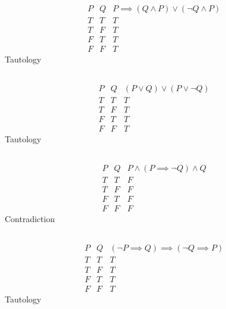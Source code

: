 \documentclass{article}
\begin{document}
\begin{equation}
    \begin{array}{c|c|c}
        P & Q & P \implies (Q \land P) \lor (\lnot Q \land P) \\
        \hline
        T & T & T \\
        T & F & T \\
        F & T & T \\
        F & F & T
    \end{array}
\end{equation}
Tautology

\subsection{}

\begin{equation}
    \begin{array}{c|c|c}
        P & Q & (P \lor Q) \lor (P \lor \lnot Q) \\
        \hline
        T & T & T \\
        T & F & T \\
        F & T & T \\
        F & F & T
    \end{array}
\end{equation}
Tautology

\subsection{}

\begin{equation}
    \begin{array}{c|c|c}
        P & Q & P \land (P \implies \lnot Q) \land Q \\
        \hline
        T & T & F \\
        T & F & F \\
        F & T & F \\
        F & F & F
    \end{array}
\end{equation}
Contradiction

\subsection{}

\begin{equation}
    \begin{array}{c|c|c}
        P & Q & (\lnot P \implies Q) \implies (\lnot Q \implies P) \\
        \hline
        T & T & T \\
        T & F & T \\
        F & T & T \\
        F & F & T
    \end{array}
\end{equation}
Tautology
\end{document}
